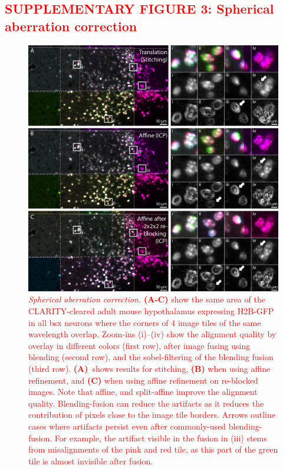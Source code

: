 \documentclass[]{spie}  %
\def\red{\textcolor{red}}
\begin{document}
\subsection*{\red{SUPPLEMENTARY FIGURE 3: Spherical aberration correction}}
\vspace{1mm}
\begin{figure}[h!]
\includegraphics[width=\textwidth]{fig-sph_aberrations.jpg}
\vspace{-2.0mm}
\caption{\hspace{-0.5mm} \red{\emph{Spherical aberration correction.} \textbf{(A-C)} show the same area of the CLARITY-cleared adult mouse hypothalamus expressing H2B-GFP in all bsx neurons where the corners of 4 image tiles of the same wavelength overlap. Zoom-ins (i)--(iv) show the alignment quality by overlay in different colors (first row), after image fusing using blending (second row), and the sobel-filtering of the blending fusion (third row). \textbf{(A)}~shows results for stitching, \textbf{(B)} when using affine refinement, and \textbf{(C)} when using affine refinement on re-blocked images. Note that affine, and split-affine improve the alignment quality. Blending-fusion can reduce the artifacts as it reduces the contribution of pixels close to the image tile borders. Arrows outline cases where artifacts persist even after commonly-used blending-fusion. For example, the artifact visible in the fusion in (iii) stems from misalignments of the pink and red tile, as this part of the green tile is almost invisible after fusion.
}}
\label{fig:sup-spherical}
\end{figure}
\end{document}
